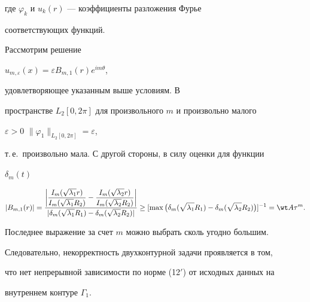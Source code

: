 где $\varphi_k$ и $u_k(r)$ --- коэффициенты разложения Фурье 


соответствующих функций. 


Рассмотрим решение 


$u_{m,\varepsilon}(x)=\varepsilon{}B_{m,1}(r)e^{im\theta}$, 


удовлетворяющее указанным выше условиям. В 


пространстве $L_2[0,2\pi]$ для произвольного $m$ и произвольно малого 


$\varepsilon>0$\; $\|\varphi_1\|_{L_2[0,2\pi]}=\varepsilon$, 


т.\,е.~произвольно мала. С другой стороны, в силу оценки для функции 


$\delta_m(t)$ \cite{2} 


$$ 


|B_{m,1}(r)|= 


\frac{ 


\displaystyle\bigg| 


\frac{I_m(\sqrt{\lambda_1}r)}{I_m(\sqrt{\lambda_1}R_2)}- 


\frac{I_m(\sqrt{\lambda_2}r)}{I_m(\sqrt{\lambda_2}R_2)} 


\bigg|} 


{|\delta_m(\sqrt{\lambda_1}R_1)-\delta_m(\sqrt{\lambda_2}R_2)|} 


\ge[\max\big(\delta_m(\sqrt{\lambda_1}R_1)-\delta_m 


(\sqrt{\lambda_2}R_2)\big)]^{-1}=\wt A\tau^m. 


$$ 


Последнее выражение за счет $m$ можно выбрать сколь угодно большим. 


Следовательно, некорректность двухконтурной задачи проявляется в том, 


что нет непрерывной зависимости по норме (12$'$) от исходных данных на 


внутреннем контуре $\Gamma_1$. 


 


